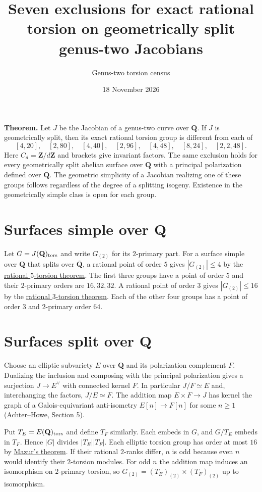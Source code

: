 \documentclass[11pt]{article}
\title{Seven exclusions for exact rational torsion on geometrically split genus-two Jacobians}
\author{Genus-two torsion census}
\date{18 November 2026}
\begin{document}
\maketitle

\textbf{Theorem.} Let $J$ be the Jacobian of a genus-two curve over $\mathbf Q$.
If $J$ is geometrically split, then its exact rational torsion group is different from each of
\[
 [4,20],\quad [2,80],\quad [4,40],\quad [2,96],\quad [4,48],\quad [8,24],\quad [2,2,48].
\]
Here $C_d=\mathbf Z/d\mathbf Z$ and brackets give invariant factors. The same exclusion holds for every geometrically split abelian surface over $\mathbf Q$ with a principal polarization defined over $\mathbf Q$. The geometric simplicity of a Jacobian realizing one of these groups follows regardless of the degree of a splitting isogeny. Existence in the geometrically simple class is open for each group.

\section*{Surfaces simple over $\mathbf Q$}
Let $G=J(\mathbf Q)_{\rm tors}$ and write $G_{(2)}$ for its $2$-primary part. For a surface simple over $\mathbf Q$ that splits over $\overline{\mathbf Q}$, a rational point of order $5$ gives $|G_{(2)}|\le4$ by the \href{https://genus-2-torsion.github.io/proofs/qsimple-40-obstruction.html}{rational $5$-torsion theorem}. The first three groups have a point of order $5$ and their $2$-primary orders are $16,32,32$. A rational point of order $3$ gives $|G_{(2)}|\le16$ by the \href{https://genus-2-torsion.github.io/proofs/qsimple-96-obstruction.html}{rational $3$-torsion theorem}. Each of the other four groups has a point of order $3$ and $2$-primary order $64$.

\section*{Surfaces split over $\mathbf Q$}
Choose an elliptic subvariety $E$ over $\mathbf Q$ and its polarization complement $F$. Dualizing the inclusion and composing with the principal polarization gives a surjection $J\to E^\vee$ with connected kernel $F$. In particular $J/F\simeq E$ and, interchanging the factors, $J/E\simeq F$. The addition map $E\times F\to J$ has kernel the graph of a Galois-equivariant anti-isometry $E[n]\to F[n]$ for some $n\ge1$ (\href{https://msp.org/ant/2017/11-1/ant-v11-n1-p02-p.pdf}{Achter--Howe, Section 5}).

Put $T_E=E(\mathbf Q)_{\rm tors}$ and define $T_F$ similarly. Each embeds in $G$, and $G/T_E$ embeds in $T_F$. Hence $|G|$ divides $|T_E||T_F|$. Each elliptic torsion group has order at most $16$ by \href{https://www.numdam.org/item/PMIHES_1977__47__33_0/}{Mazur's theorem}. If their rational $2$-ranks differ, $n$ is odd because even $n$ would identify their $2$-torsion modules. For odd $n$ the addition map induces an isomorphism on $2$-primary torsion, so $G_{(2)}=(T_E)_{(2)}\times(T_F)_{(2)}$ up to isomorphism.
\end{document}
